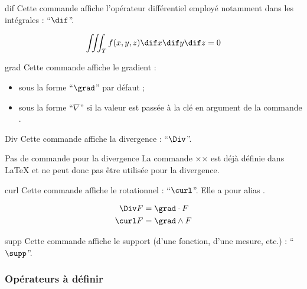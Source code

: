 \documentclass[french,nolocaltoc]{nwejmart}
\newtheorem[style=definition]{fait}
\newtheorem[title=contraventionnalisation]{ctrv}
\newtheorem[title-plural=anneaux]{anneau}
\newtheorem[title-plural=idéaux]{idéal}
\begin{document}
\begin{docCommand}{dif}{}
  Cette commande affiche l'opérateur différentiel employé notamment dans les
  intégrales : \enquote{$\dif$}.
\begin{bodycode}
\begin{equation}
\iiint_T f(x,y,z)\dif x \dif y \dif z=0
\end{equation}
\end{bodycode}
\end{docCommand}

\begin{docCommand}{grad}{}
  Cette commande affiche le gradient :
  \begin{itemize}
  \item sous la forme \enquote{$\grad$} par défaut ;
  \item sous la forme \enquote{$\nabla$} si la valeur  est
    passée à la clé  en argument de la commande
    .
  \end{itemize}
\end{docCommand}

\begin{docCommand}{Div}{}
  Cette commande affiche la divergence : \enquote{$\Div$}.
  \begin{dbremark}{Pas de commande \protect{} pour la divergence}{}
    La commande ×\div× est déjà définie dans \LaTeX{} et ne peut donc pas être
    utilisée pour la divergence.
  \end{dbremark}
\end{docCommand}

\begin{docCommand}{curl}{}
  Cette commande affiche le rotationnel :
  \enquote{$\curl$}. Elle a pour alias .
\end{docCommand}

\begin{bodycode}
\begin{align}
  \Div  F & = \grad \cdot  F \\
  \curl F & = \grad \wedge F
\end{align}
\end{bodycode}

\begin{docCommand}{supp}{}
  Cette commande affiche le support (d'une fonction, d'une mesure, etc.) :
  \enquote{$\supp$}.
\end{docCommand}

\subsubsection{Opérateurs à définir}
\end{document}
